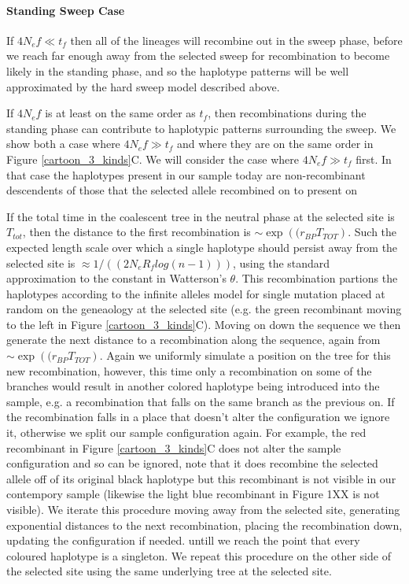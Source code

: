 \documentclass[a4paper,10pt]{article}
\begin{document}
\paragraph{Standing Sweep Case}
If $4N_e f \ll t_f$ then all of the lineages will recombine out in the sweep phase, before we reach far enough away from the selected sweep for recombination to become likely in the standing phase, and so the haplotype patterns will be well approximated by the hard sweep model described above. 

If $4N_e f$ is at least on the same order as $t_f$, then recombinations during the standing phase can contribute to haplotypic patterns surrounding the sweep. We show both a case where $4N_e f \gg t_f$ and where they are on the same order in Figure \ref{cartoon_3_kinds}C. We will consider the case where $4N_e f \gg t_f$ first. In that case the haplotypes present in our sample today are non-recombinant descendents of those that the selected allele recombined on to present on 

If the total time in the coalescent tree in the neutral phase at the selected site is $T_{tot}$, then the distance to the first recombination is $\sim \exp \left( (r_{BP} T_{TOT} \right)$. Such the expected length scale over which a single haplotype should persist away from the selected site is $\approx 1/( (2 N_e R_f log(n-1)))$, using the standard approximation to the constant in Watterson's $\theta$. This recombination partions the haplotypes according to the infinite alleles model for single mutation placed at random on the geneaology at the selected site (e.g. the green recombinant moving to the left in Figure \ref{cartoon_3_kinds}C). Moving on down the sequence we then generate the next distance to a recombination along the sequence, again from $\sim \exp \left( (r_{BP} T_{TOT} \right)$. Again we uniformly simulate a position on the tree for this new recombination, however, this time only a recombination on some of the branches would result in another colored haplotype being introduced into the sample, e.g. a recombination that falls on the same branch as the previous on. If the recombination falls in a place that doesn't alter the configuration we ignore it, otherwise we split our sample configuration again. For example, the red recombinant in Figure \ref{cartoon_3_kinds}C does not alter the sample configuration and so can be ignored, note that it does recombine the selected allele off of its original black haplotype but this recombinant is not visible in our contempory sample (likewise the light blue recombinant in Figure 1XX is not visible). We iterate this procedure moving away from the selected site, generating exponential distances to the next recombination, placing the recombination down, updating the configuration if needed. untill we reach the point that every coloured haplotype is a singleton. We repeat this procedure on the other side of the selected site using the same underlying tree at the selected site. 
\end{document}
